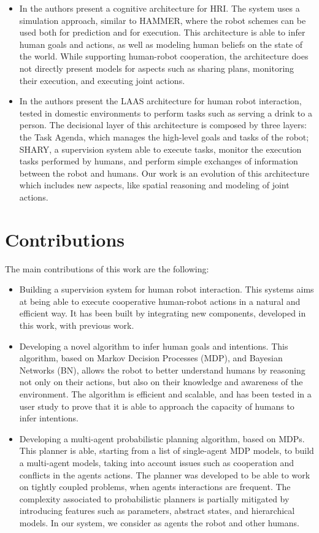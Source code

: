 \begin{itemize}
\item In \cite{BreazealGB09} the authors present a cognitive architecture for HRI. The system uses a simulation approach, similar to HAMMER, where the robot schemes can be used both for prediction and for execution. This architecture is able to infer human goals and actions, as well as modeling human beliefs on the state of the world. While supporting human-robot cooperation, the architecture does not directly present models for aspects such as sharing plans, monitoring their execution, and executing joint actions. 


\item In \cite{clodic2009shary} the authors present the LAAS architecture
 for human robot interaction, tested in domestic environments to
perform tasks such as serving a drink to a person. The decisional layer of this architecture
is composed by three layers: the Task Agenda, which manages the high-level goals and tasks of the 
robot; SHARY, a supervision system able to execute tasks, monitor the execution tasks performed by humans, and perform simple exchanges of information between the robot and humans. Our work is an
evolution of this architecture which includes new aspects, like spatial
reasoning and modeling of joint actions.


\end{itemize}

\section{Contributions}

The main contributions of this work are the following:
\begin{itemize}
\item Building a supervision system for human robot interaction. This systems aims at being able to execute cooperative human-robot actions in a natural and efficient way. It has been built by integrating new components, developed in this work, with previous work.
\item Developing a novel algorithm to infer human goals and intentions. This algorithm, based on Markov Decision Processes (MDP), and Bayesian Networks (BN), allows the robot to better understand humans by reasoning not only on their actions, but also on their knowledge and awareness of the environment. The algorithm is efficient and scalable, and has been tested in a user study to prove that it is able to approach the capacity of humans to infer intentions.
\item Developing a multi-agent probabilistic planning algorithm, based on MDPs. This planner is able, starting from a list of single-agent MDP models, to build a multi-agent models, taking into account issues such as cooperation and conflicts in the agents actions. The planner was developed to be able to work on tightly coupled problems, when agents interactions are frequent. The complexity associated to probabilistic planners is partially mitigated by introducing features such as parameters, abstract states, and hierarchical models. In our system, we consider as agents the robot and other humans.
\end{itemize}

